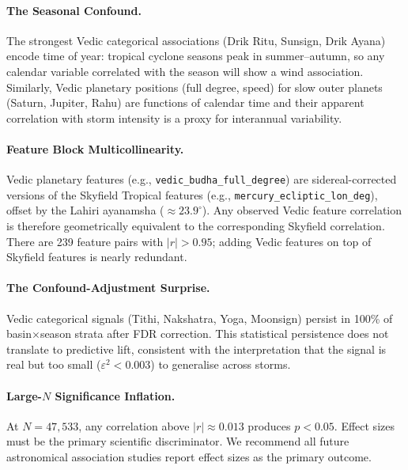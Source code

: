 \documentclass[12pt,a4paper]{article}
\begin{document}
    \paragraph{The Seasonal Confound.}
    The strongest Vedic categorical associations (Drik Ritu, Sunsign, Drik Ayana)
    encode time of year: tropical cyclone seasons peak in summer--autumn, so any
    calendar variable correlated with the season will show a wind association.
    Similarly, Vedic planetary positions (full degree, speed) for slow outer
    planets (Saturn, Jupiter, Rahu) are functions of calendar time and their
    apparent correlation with storm intensity is a proxy for interannual
    variability.

    \paragraph{Feature Block Multicollinearity.}
    Vedic planetary features (e.g., \texttt{vedic\_budha\_full\_degree}) are
    sidereal-corrected versions of the Skyfield Tropical features
    (e.g., \texttt{mercury\_ecliptic\_lon\_deg}), offset by the Lahiri ayanamsha
    ($\approx 23.9^\circ$). Any observed Vedic feature correlation is therefore
    geometrically equivalent to the corresponding Skyfield correlation. There are
    239 feature pairs with $|r| > 0.95$; adding Vedic features on top of Skyfield
    features is nearly redundant.

    \paragraph{The Confound-Adjustment Surprise.}
    Vedic categorical signals (Tithi, Nakshatra, Yoga, Moonsign) persist in 100\%
    of basin$\times$season strata after FDR correction. This statistical persistence
    does not translate to predictive lift, consistent with the interpretation that
    the signal is real but too small ($\varepsilon^2 < 0.003$) to generalise
    across storms.

    \paragraph{Large-$N$ Significance Inflation.}
    At $N = 47{,}533$, any correlation above $|r| \approx 0.013$ produces
    $p < 0.05$. Effect sizes must be the primary scientific discriminator.
    We recommend all future astronomical association studies report effect sizes
    as the primary outcome.

\end{document}
